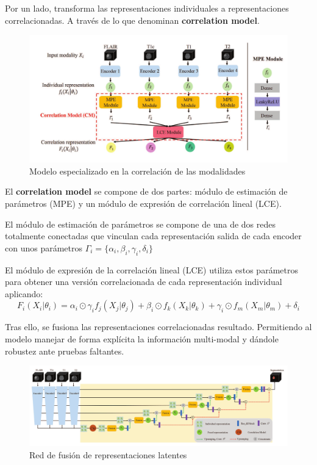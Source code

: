 		Por un lado, transforma las representaciones individuales a representaciones correlacionadas. A través de lo que denominan \textbf{correlation model}.
		
		\begin{figure}[H]
			\centering
			\includegraphics[width=1.0\linewidth]{imagenes/zhoufusionmodel.png}
			\caption{Modelo especializado en la correlación de las modalidades}
		\end{figure}
		
		El \textbf{correlation model} se compone de dos partes: módulo de estimación de parámetros (MPE) y un módulo de expresión de correlación lineal (LCE).
		
		El módulo de estimación de parámetros se compone de una de dos redes totalmente conectadas que vinculan cada representación salida de cada encoder con unos parámetros $ \Gamma_i = \{ \alpha_i , \beta_i , \gamma_i , \delta_i \}$
		
		El módulo de expresión de la correlación lineal (LCE) utiliza estos parámetros para obtener una versión correlacionada de cada representación individual aplicando: 
		$$ F_i (X_i | \theta_i ) = \alpha_i \odot \gamma_i f_j (X_j | \theta_j ) + \beta_i \odot f_k (X_k | \theta_k ) + \gamma_i \odot f_m (X_m | \theta_m ) + \delta_i $$
		
		Tras ello, se fusiona las representaciones correlacionadas resultado. Permitiendo al modelo manejar de forma explícita la información multi-modal y dándole robustez ante pruebas faltantes. 
		
		\begin{figure}[H]
			\centering
			\includegraphics[width=1.0\linewidth]{imagenes/zhouarchitecture.png}
			\caption{Red \cite{zhou2021latent} de fusión de representaciones latentes}
		\end{figure}
		
